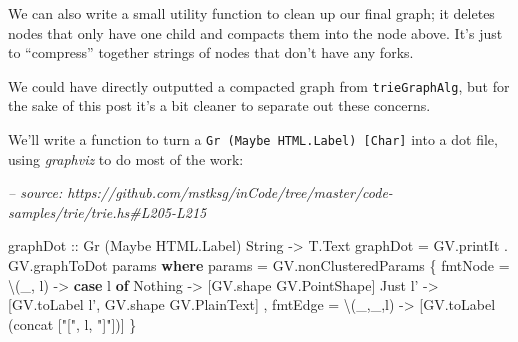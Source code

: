 \documentclass[]{article}
\newenvironment{Shaded}{}{}
\newcommand{\CommentTok}[1]{\textcolor[rgb]{0.38,0.63,0.69}{\textit{#1}}}
\newcommand{\DataTypeTok}[1]{\textcolor[rgb]{0.56,0.13,0.00}{#1}}
\newcommand{\FunctionTok}[1]{\textcolor[rgb]{0.02,0.16,0.49}{#1}}
\newcommand{\KeywordTok}[1]{\textcolor[rgb]{0.00,0.44,0.13}{\textbf{#1}}}
\newcommand{\NormalTok}[1]{#1}
\newcommand{\OtherTok}[1]{\textcolor[rgb]{0.00,0.44,0.13}{#1}}
\newcommand{\StringTok}[1]{\textcolor[rgb]{0.25,0.44,0.63}{#1}}
\begin{document}
We can also write a small utility function to clean up our final graph; it
deletes nodes that only have one child and compacts them into the node above.
It's just to ``compress'' together strings of nodes that don't have any forks.

\begin{Shaded}
\end{Shaded}

We could have directly outputted a compacted graph from \texttt{trieGraphAlg},
but for the sake of this post it's a bit cleaner to separate out these concerns.

We'll write a function to turn a \texttt{Gr\ (Maybe\ HTML.Label)\ {[}Char{]}}
into a dot file, using \emph{graphviz} to do most of the work:

\begin{Shaded}
\begin{Highlighting}[]
\CommentTok{-- source: https://github.com/mstksg/inCode/tree/master/code-samples/trie/trie.hs#L205-L215}

\NormalTok{graphDot}
\OtherTok{    ::} \DataTypeTok{Gr}\NormalTok{ (}\DataTypeTok{Maybe} \DataTypeTok{HTML.Label}\NormalTok{) }\DataTypeTok{String}
    \OtherTok{->} \DataTypeTok{T.Text}
\NormalTok{graphDot }\FunctionTok{=}\NormalTok{ GV.printIt }\FunctionTok{.}\NormalTok{ GV.graphToDot params}
  \KeywordTok{where}
\NormalTok{    params }\FunctionTok{=}\NormalTok{ GV.nonClusteredParams}
\NormalTok{      \{ fmtNode }\FunctionTok{=}\NormalTok{ \textbackslash{}(_,  l) }\OtherTok{->} \KeywordTok{case}\NormalTok{ l }\KeywordTok{of}
          \DataTypeTok{Nothing} \OtherTok{->}\NormalTok{ [GV.shape }\DataTypeTok{GV.PointShape}\NormalTok{]}
          \DataTypeTok{Just}\NormalTok{ l' }\OtherTok{->}\NormalTok{ [GV.toLabel l', GV.shape }\DataTypeTok{GV.PlainText}\NormalTok{]}
\NormalTok{      , fmtEdge }\FunctionTok{=}\NormalTok{ \textbackslash{}(_,_,l) }\OtherTok{->}\NormalTok{ [GV.toLabel (concat [}\StringTok{"["}\NormalTok{, l, }\StringTok{"]"}\NormalTok{])]}
\NormalTok{      \}}
\end{Highlighting}
\end{Shaded}
\end{document}
